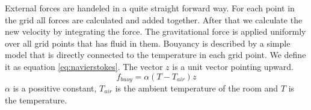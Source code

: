 External forces are handeled in a quite straight forward way. 
For each point in the grid all forces are calculated and added together. 
After that we calculate the new velocity by integrating the force.
The gravitational force is applied uniformly over all grid points that has fluid in them.
Bouyancy is described by a simple model that is directly connected to the temperature in each grid point.
We define it as equation \ref{eq:navierstokes}.
The vector $z$ is a unit vector pointing upward. 
\begin{equation}
\label{eq:buoyancy}
f_{buoy} = \alpha(T-T_{air})z
\end{equation}
$\alpha$ is a possitive constant, $T_{air}$ is the ambient temperature of the room and $T$ is the temperature. 
